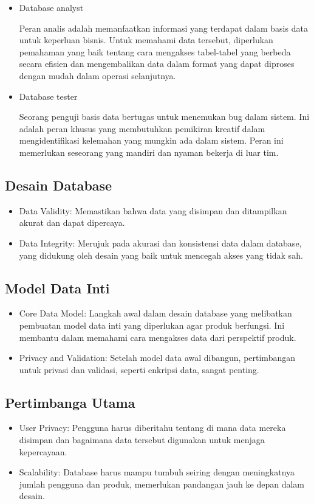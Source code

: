 \documentclass{article}
\begin{document}
\begin{itemize}
      \item Database analyst

            Peran analis adalah memanfaatkan informasi yang terdapat dalam basis data untuk keperluan bisnis. Untuk memahami data tersebut, diperlukan pemahaman yang baik tentang cara mengakses tabel-tabel yang berbeda secara efisien dan mengembalikan data dalam format yang dapat diproses dengan mudah dalam operasi selanjutnya.

      \item Database tester

            Seorang penguji basis data bertugas untuk menemukan bug dalam sistem. Ini adalah peran khusus yang membutuhkan pemikiran kreatif dalam mengidentifikasi kelemahan yang mungkin ada dalam sistem. Peran ini memerlukan seseorang yang mandiri dan nyaman bekerja di luar tim.
\end{itemize}

\subsection{Desain Database}
\begin{itemize}
      \item Data Validity: Memastikan bahwa data yang disimpan dan ditampilkan akurat dan dapat dipercaya.
      \item Data Integrity: Merujuk pada akurasi dan konsistensi data dalam database, yang didukung oleh desain yang baik untuk mencegah akses yang tidak sah.
\end{itemize}

\subsection{Model Data Inti}
\begin{itemize}
      \item Core Data Model: Langkah awal dalam desain database yang melibatkan pembuatan model data inti yang diperlukan agar produk berfungsi. Ini membantu dalam memahami cara mengakses data dari perspektif produk.
      \item Privacy and Validation: Setelah model data awal dibangun, pertimbangan untuk privasi dan validasi, seperti enkripsi data, sangat penting.
\end{itemize}

\subsection{Pertimbanga Utama}
\begin{itemize}
      \item User Privacy: Pengguna harus diberitahu tentang di mana data mereka disimpan dan bagaimana data tersebut digunakan untuk menjaga kepercayaan.
      \item Scalability: Database harus mampu tumbuh seiring dengan meningkatnya jumlah pengguna dan produk, memerlukan pandangan jauh ke depan dalam desain.
\end{itemize}
\end{document}
